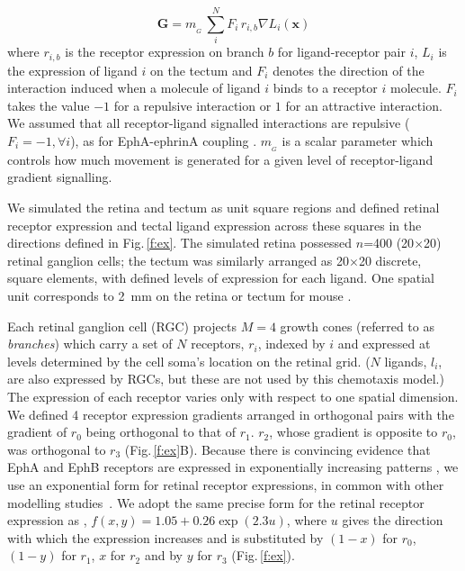 \documentclass[11pt, a4paper]{article}
\begin{document}
\begin{equation}\label{e:G}
\mathbf{G} = m_{\!_G}\,\sum_i^N F_i\,r_{i,b} \nabla L_i(\mathbf{x})
\end{equation}
%
where $r_{i,b}$ is the receptor expression on branch $b$ for ligand-receptor pair $i$, $L_i$ is the expression of ligand $i$ on the tectum and $F_i$ denotes the direction of the interaction induced when a molecule of ligand $i$ binds to a receptor $i$ molecule. 
$F_i$ takes the value $-1$ for a repulsive interaction or $1$ for an attractive interaction.
%
We assumed that all receptor-ligand signalled interactions are repulsive ($F_i=-1, \forall i$), as for EphA-ephrinA coupling \citep{drescher_vitro_1995,nakamoto_topographically_1996}.
%
$m_{\!_G}$ is a scalar parameter which controls how much movement is generated for a given level of receptor-ligand gradient signalling.

We simulated the retina and tectum as unit square regions and defined retinal receptor expression and tectal ligand expression across these squares in the directions defined in Fig.\,\ref{f:ex}. 
The simulated retina possessed $n$=400 (20$\times$20) retinal ganglion cells; the tectum was similarly arranged as 20$\times$20 discrete, square elements, with defined levels of expression for each ligand. 
One spatial unit corresponds to 2~mm on the retina or tectum for mouse \citep{reber_relative_2004}.

Each retinal ganglion cell (RGC) projects $M=4$ growth cones (referred to as \emph{branches}) which carry a set of $N$ receptors, $r_i$, indexed by $i$ and expressed at levels determined by the cell soma's location on the retinal grid. 
($N$ ligands, $l_i$, are also expressed by RGCs, but these are not used by this chemotaxis model.) 
The expression of each receptor varies only with respect to one spatial dimension.
%
We defined 4 receptor expression gradients arranged in orthogonal pairs with the gradient of $r_0$ being orthogonal to that of $r_1$. $r_2$, whose gradient is opposite to $r_0$, was orthogonal to $r_3$ (Fig.\,\ref{f:ex}B).
%
Because there is convincing evidence that EphA and EphB receptors are expressed in exponentially increasing patterns \citep{reber_relative_2004,feldheim_genetic_2000,brown_topographic_2000,koulakov_stochastic_2004}, we use an exponential form for retinal receptor expressions, in common with other modelling studies~\citep{reber_relative_2004,koulakov_stochastic_2004,simpson_simple_2011}.
We adopt the same precise form for the retinal receptor expression as \citet{simpson_simple_2011}, $f(x,y) = 1.05 + 0.26 \exp(2.3 u)$, where $u$ gives the direction with which the expression increases and is substituted by $(1-x)$ for $r_0$, $(1-y)$ for $r_1$, $x$ for $r_2$ and by $y$ for $r_3$ (Fig.\,\ref{f:ex}).
\end{document}
